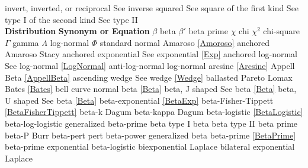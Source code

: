 \noindent
invert, inverted, or reciprocal		\dotfill	See inverse\ncite
squared						\dotfill	See square\ncite
of the first kind					\dotfill	See type I\ncite
of the second kind				\dotfill	See type II\ncite
~\\
\noindent
{\bf Distribution} \hfill {\bf Synonym or Equation}								\ncite
%
$\beta$ 						\dotfill	beta							  	\ncite	%
$\beta'$ 						\dotfill	beta prime							\ncite	%
$\chi$ 							\dotfill	chi									\ncite	%
$\chi^2$ 						\dotfill	chi-square							\ncite 	%
$\Gamma$ 						\dotfill	gamma 								\ncite 	%
$\Lambda$						\dotfill	log-normal 							   	%
$\Phi$							\dotfill	standard normal 					\ncite	%
%
Amaroso							\dotfill	\eqref{Amoroso}						\ncite	%
anchored Amaroso				\dotfill	Stacy								\mcite{\self}
anchored exponential			\dotfill	See exponential \eqref{Exp}			\ncite	%
anchored log-normal				\dotfill	See log-normal \eqref{LogNormal}	\ncite
anti-log-normal 				\dotfill	log-normal 							\ncite	%
arcsine 						\dotfill	\eqref{Arcsine} 					 \ncite	%
Appell Beta						\dotfill	\eqref{AppellBeta}					 
ascending wedge					\dotfill	See wedge \eqref{Wedge} 			\ncite	%
%
ballasted Pareto				\dotfill	Lomax								\ncite	%
Bates							\dotfill	\eqref{Bates}						\ncite
bell curve 						\dotfill	normal 								\ncite	%
beta 							\dotfill	\eqref{Beta} 						\ncite	%
beta, J shaped					\dotfill	See beta \eqref{Beta} 				\ncite	%
beta, U shaped					\dotfill	See beta \eqref{Beta} 				\ncite	%
beta-exponential				\dotfill	\eqref{BetaExp}						\ncite	%
beta-Fisher-Tippett				\dotfill	\eqref{BetaFisherTippett}			\ncite	
beta-k							\dotfill	Dagum									%
beta-kappa 						\dotfill	Dagum  									%
beta-logistic					\dotfill	\eqref{BetaLogistic}				\mcite{\self}	%
beta-log-logistic				\dotfill	generalized beta-prime				\mcite{\self}	%
beta type I 					\dotfill	beta 								\ncite	%
beta type II 					\dotfill	beta prime							\ncite	%
beta-P 							\dotfill	Burr 				 					%
beta-pert						\dotfill	pert 								\ncite	%
beta-power						\dotfill	generalized beta					\ncite	%
beta-prime 						\dotfill	\eqref{BetaPrime} 					\ncite	%
beta-prime exponential			\dotfill	beta-logistic						\mcite{\self} %
biexponential					\dotfill	Laplace								\ncite	%
bilateral exponential  			\dotfill	Laplace 							\ncite	%
